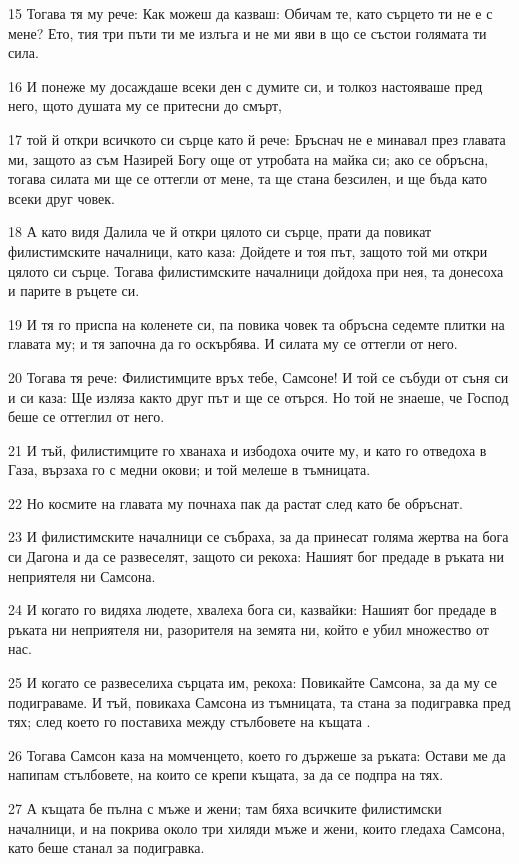 \par 15 Тогава тя му рече: Как можеш да казваш: Обичам те, като сърцето ти не е с мене? Ето, тия три пъти ти ме излъга и не ми яви в що се състои голямата ти сила.
\par 16 И понеже му досаждаше всеки ден с думите си, и толкоз настояваше пред него, щото душата му се притесни до смърт,
\par 17 той й откри всичкото си сърце като й рече: Бръснач не е минавал през главата ми, защото аз съм Назирей Богу още от утробата на майка си; ако се обръсна, тогава силата ми ще се оттегли от мене, та ще стана безсилен, и ще бъда като всеки друг човек.
\par 18 А като видя Далила че й откри цялото си сърце, прати да повикат филистимските началници, като каза: Дойдете и тоя път, защото той ми откри цялото си сърце. Тогава филистимските началници дойдоха при нея, та донесоха и парите в ръцете си.
\par 19 И тя го приспа на коленете си, па повика човек та обръсна седемте плитки на главата му; и тя започна да го оскърбява. И силата му се оттегли от него.
\par 20 Тогава тя рече: Филистимците връх тебе, Самсоне! И той се събуди от съня си и си каза: Ще изляза както друг път и ще се отърся. Но той не знаеше, че Господ беше се оттеглил от него.
\par 21 И тъй, филистимците го хванаха и избодоха очите му, и като го отведоха в Газа, вързаха го с медни окови; и той мелеше в тъмницата.
\par 22 Но космите на главата му почнаха пак да растат след като бе обръснат.
\par 23 И филистимските началници се събраха, за да принесат голяма жертва на бога си Дагона и да се развеселят, защото си рекоха: Нашият бог предаде в ръката ни неприятеля ни Самсона.
\par 24 И когато го видяха людете, хвалеха бога си, казвайки: Нашият бог предаде в ръката ни неприятеля ни, разорителя на земята ни, който е убил множество от нас.
\par 25 И когато се развеселиха сърцата им, рекоха: Повикайте Самсона, за да му се подиграваме. И тъй, повикаха Самсона из тъмницата, та стана за подигравка пред тях; след което го поставиха между стълбовете на къщата .
\par 26 Тогава Самсон каза на момченцето, което го държеше за ръката: Остави ме да напипам стълбовете, на които се крепи къщата, за да се подпра на тях.
\par 27 А къщата бе пълна с мъже и жени; там бяха всичките филистимски началници, и на покрива около три хиляди мъже и жени, които гледаха Самсона, като беше станал за подигравка.
